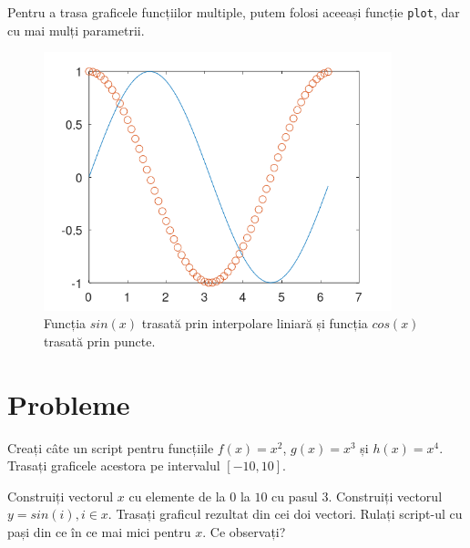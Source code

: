 \documentclass{exam}
\newcommand{\octavescript}[2]{

}
\begin{document}
\newpage
\par Pentru a trasa graficele funcțiilor multiple, putem folosi aceeași funcție
\verb|plot|, dar cu mai mulți parametrii.

\octavescript{./src/plot2.m}{}

\begin{figure}[ht]
	\centering
	\includegraphics[width=0.9\textwidth]{plot2}
	\caption{Funcția $sin(x)$ trasată prin interpolare liniară și funcția $cos(x)$ trasată prin puncte.}
\end{figure}

\section{Probleme}

\begin{questions}
	\boxedpoints
	\pointsinmargin

	\question Creați câte un script pentru funcțiile $f(x) = x^2$, $g(x) = x^3$
	și $h(x) = x^4$.
	Trasați graficele acestora pe intervalul $[-10, 10]$.

	\question Construiți vectorul $x$ cu elemente de la $0$ la $10$ cu pasul $3$.
	Construiți vectorul $y = sin(i), i \in x$. Trasați graficul rezultat din cei
	doi vectori. Rulați script-ul cu pași din ce în ce mai mici pentru $x$. Ce
	observați?
\end{questions}
\end{document}
